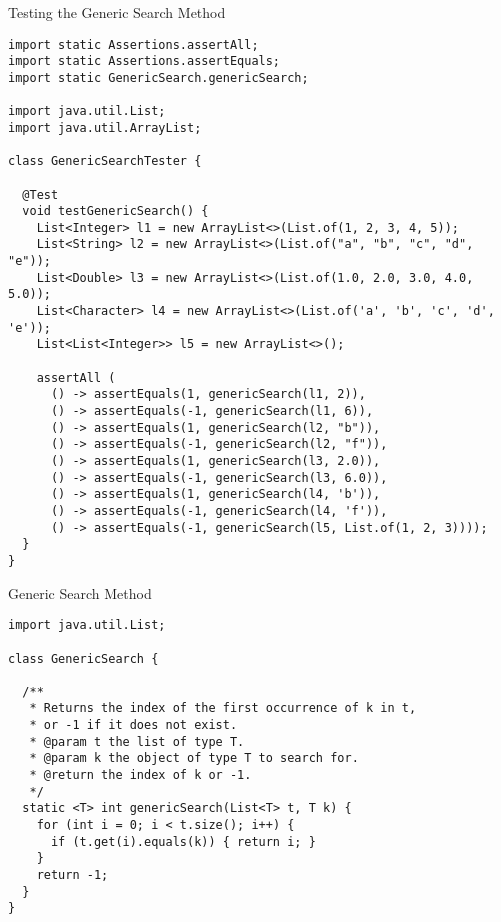 
\begin{cl}[]{Testing the Generic Search Method}
\begin{lstlisting}[language=MyJava]
import static Assertions.assertAll;
import static Assertions.assertEquals;
import static GenericSearch.genericSearch;

import java.util.List;
import java.util.ArrayList;

class GenericSearchTester {

  @Test 
  void testGenericSearch() {
    List<Integer> l1 = new ArrayList<>(List.of(1, 2, 3, 4, 5));
    List<String> l2 = new ArrayList<>(List.of("a", "b", "c", "d", "e"));
    List<Double> l3 = new ArrayList<>(List.of(1.0, 2.0, 3.0, 4.0, 5.0));
    List<Character> l4 = new ArrayList<>(List.of('a', 'b', 'c', 'd', 'e'));
    List<List<Integer>> l5 = new ArrayList<>();

    assertAll (
      () -> assertEquals(1, genericSearch(l1, 2)),
      () -> assertEquals(-1, genericSearch(l1, 6)),
      () -> assertEquals(1, genericSearch(l2, "b")),
      () -> assertEquals(-1, genericSearch(l2, "f")),
      () -> assertEquals(1, genericSearch(l3, 2.0)),
      () -> assertEquals(-1, genericSearch(l3, 6.0)),
      () -> assertEquals(1, genericSearch(l4, 'b')),
      () -> assertEquals(-1, genericSearch(l4, 'f')),
      () -> assertEquals(-1, genericSearch(l5, List.of(1, 2, 3))));
  }
}
\end{lstlisting}
\end{cl}

\begin{cl}[]{Generic Search Method}
\begin{lstlisting}[language=MyJava]
import java.util.List;

class GenericSearch {

  /**
   * Returns the index of the first occurrence of k in t, 
   * or -1 if it does not exist.
   * @param t the list of type T.
   * @param k the object of type T to search for.
   * @return the index of k or -1.
   */
  static <T> int genericSearch(List<T> t, T k) {
    for (int i = 0; i < t.size(); i++) {
      if (t.get(i).equals(k)) { return i; }
    }
    return -1;
  }
}
\end{lstlisting}
\end{cl}

